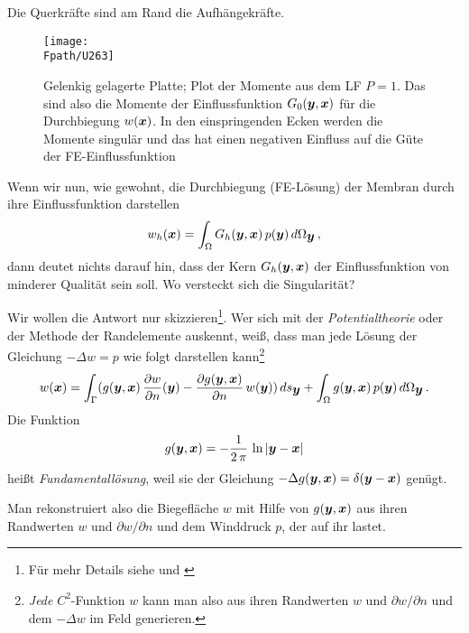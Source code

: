 {Die Querkr\"{a}fte sind am Rand die Aufh\"{a}ngekr\"{a}fte.
\begin{figure}[tbp]
\centering
\if {} \sidecaption \fi
\texttt{[image: \\Fpath/U263]}
\caption{Gelenkig gelagerte Platte; Plot der Momente aus dem LF $P = 1$. Das sind also die Momente der Einflussfunktion $G_0(\mbox{\boldmath $y$},\mbox{\boldmath $x$})$ f\"{u}r die Durchbiegung $w(\mbox{\boldmath $x$})$. In den einspringenden Ecken werden die Momente singul\"{a}r und das hat einen negativen Einfluss auf die G\"{u}te der FE-Einflussfunktion }
\label{U263}
\end{figure}%

Wenn wir nun, wie gewohnt, die Durchbiegung (FE-L\"{o}sung) der Membran durch ihre Einflussfunktion darstellen
\begin{align}
w_h(\mbox{\boldmath $x$}) = \int_{\Omega} G_h(\mbox{\boldmath $y$},\mbox{\boldmath $x$})\,p(\mbox{\boldmath $y$})\,d\Omega_{\mbox{\boldmath $y$}}\,,
\end{align}
dann deutet nichts darauf hin, dass der Kern $G_h(\mbox{\boldmath $y$},\mbox{\boldmath $x$})$ der Einflussfunktion von minderer Qualit\"{a}t sein soll. Wo versteckt sich die Singularit\"{a}t?

Wir wollen die Antwort nur skizzieren\footnote{F\"{u}r mehr Details siehe \cite{Ha2} und \cite{Ha6}}. Wer sich mit der {\em Potentialtheorie\/} oder der Methode der Randelemente auskennt, wei{\ss}, dass man jede L\"{o}sung  der Gleichung $- \Delta w = p$ wie folgt darstellen kann\footnote{{\em Jede\/} $C^2$-Funktion $w$ kann man also aus ihren Randwerten $w$ und $\partial w/\partial n$ und dem $- \Delta w$ im Feld generieren.}
\begin{align}
w(\mbox{\boldmath $x$}) = \int_{\Gamma} (g(\mbox{\boldmath $y$},\mbox{\boldmath $x$})\,\frac{\partial w}{\partial n}(\mbox{\boldmath $y$}) - \frac{\partial g(\mbox{\boldmath $y$},\mbox{\boldmath $x$})}{\partial n}\,w(\mbox{\boldmath $y$}))\,ds_{\mbox{\boldmath $y$}} + \int_{\Omega} g(\mbox{\boldmath $y$},\mbox{\boldmath $x$})\,p(\mbox{\boldmath $y$}) \,d\Omega_{\mbox{\boldmath $y$}}\,.
\end{align}
Die Funktion
\begin{align}
g(\mbox{\boldmath $y$},\mbox{\boldmath $x$}) = - \frac{1}{2\,\pi}\,\ln |\mbox{\boldmath $y$} - \mbox{\boldmath $x$}|
\end{align}
hei{\ss}t {\em Fundamentall\"{o}sung\/}, weil sie der Gleichung $-\Delta g(\mbox{\boldmath $y$},\mbox{\boldmath $x$}) = \delta(\mbox{\boldmath $y$}-\mbox{\boldmath $x$})$ gen\"{u}gt.

Man rekonstruiert also die Biegefl\"{a}che $w $ mit Hilfe von $g(\mbox{\boldmath $y$},\mbox{\boldmath $x$})$ aus ihren Randwerten $w$ und $\partial w/ \partial n$ und dem Winddruck $p$, der auf ihr lastet.


}
